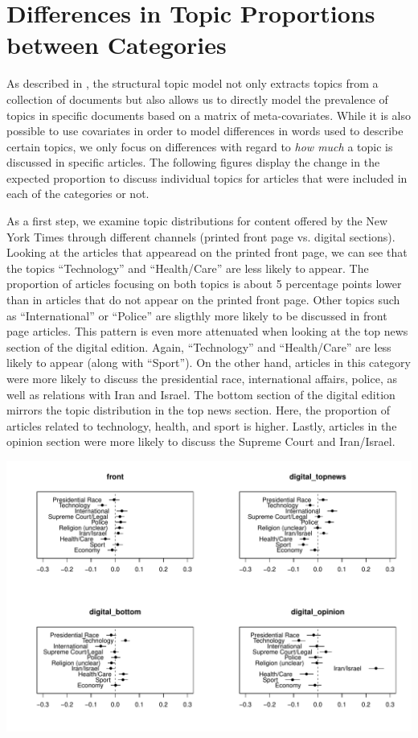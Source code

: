 \documentclass[12pt]{article}\usepackage[]{graphicx}\usepackage[]{color}
\makeatletter
\def\maxwidth{ %
  \ifdim\Gin@nat@width>\linewidth
    \linewidth
  \else
    \Gin@nat@width
  \fi
}
\newenvironment{knitrout}{}{} %
\makeatother
\begin{document}
\section{Differences in Topic Proportions between Categories}

As described in \citet{roberts2014structural}, the structural topic model not only extracts topics from a collection of documents but also allows us to directly model the prevalence of topics in specific documents based on a matrix of meta-covariates. While it is also possible to use covariates in order to model differences in words used to describe certain topics, we only focus on differences with regard to \textit{how much} a topic is discussed in specific articles. The following figures display the change in the expected proportion to discuss individual topics for articles that were included in each of the categories or not.

As a first step, we examine topic distributions for content offered by the New York Times through different channels (printed front page vs. digital sections). Looking at the articles that appearead on the printed front page, we can see that the topics ``Technology'' and ``Health/Care'' are less likely to appear. The proportion of articles focusing on both topics is about 5 percentage points lower than in articles that do not appear on the printed front page. Other topics such as ``International'' or ``Police'' are sligthly more likely to be discussed in front page articles. This pattern is even more attenuated when looking at the top news section of the digital edition. Again, ``Technology'' and ``Health/Care'' are less likely to appear (along with ``Sport''). On the other hand, articles in this category were more likely to discuss the presidential race, international affairs, police, as well as relations with Iran and Israel. The bottom section of the digital edition mirrors the topic distribution in the top news section. Here, the proportion of articles related to technology, health, and sport is higher. Lastly, articles in the opinion section were more likely to discuss the Supreme Court and Iran/Israel.


\begin{knitrout}
\color{fgcolor}
\includegraphics[width=\maxwidth]{figure/unnamed-chunk-7-1} 

\end{knitrout}
\end{document}
